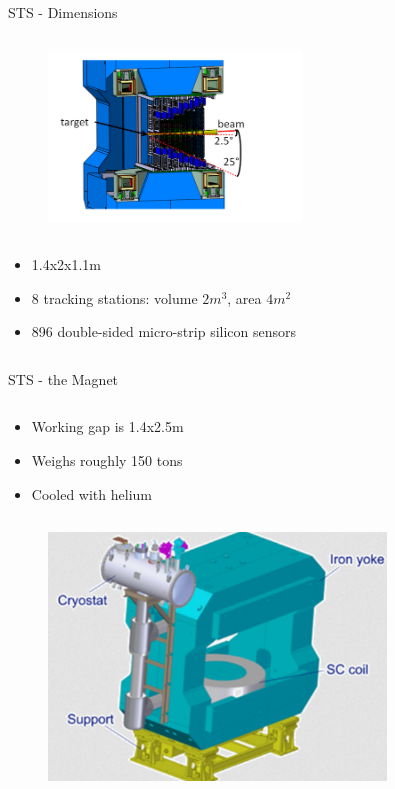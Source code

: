 \begin{columnframe}{STS - Dimensions}
    \begin{column}{0.5\textwidth}
        \begin{figure}
            \centering
            \includegraphics[width=0.6\textwidth, frame]{images/sts_dimensions.png}
        \end{figure}
    \end{column}
    \begin{column}{0.5\textwidth}
        \begin{itemize}
            \item 1.4x2x1.1m
            \item 8 tracking stations: volume $2m^3$, area $4m^2$
            \item 896 double-sided micro-strip silicon sensors
        \end{itemize}
    \end{column}
\end{columnframe}

\begin{columnframe}{STS - the Magnet}
    \begin{column}{0.5\textwidth}
        \begin{itemize}
            \item Working gap is 1.4x2.5m
            \item Weighs roughly 150 tons
            \item Cooled with helium
        \end{itemize}
    \end{column}
    \begin{column}{0.5\textwidth}
        \begin{figure}
            \centering
            \includegraphics[width=0.8\textwidth, frame]{images/sts_magnet.png}
        \end{figure}
    \end{column}
\end{columnframe}

